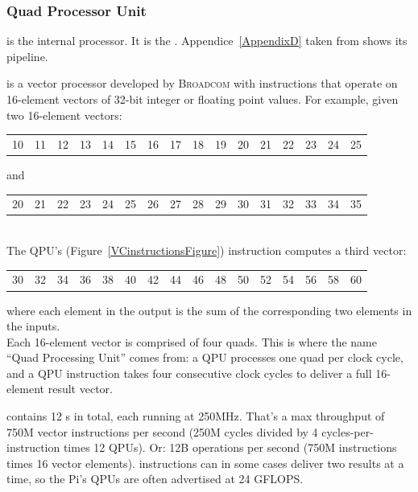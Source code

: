 \subsubsection{Quad Processor Unit}

\qpu{} is the \vc{} internal processor. It is the . Appendice~\ref{AppendixD} taken from \parencite{refVC} shows its pipeline.


\qpu{} is a  vector processor developed by \textsc{Broadcom} with instructions that operate on 16-element vectors of 32-bit integer or floating point values. For example, given two 16-element vectors:\\

\begin{tabular}{cccc|cccc|cccc|cccc}
	10&11&12&13&14&15&16&17&18&19&20&21&22&23&24&25
\end{tabular}

and

\begin{tabular}{cccc|cccc|cccc|cccc}
	20&21&22&23&24&25&26&27&28&29&30&31&32&33&34&35
\end{tabular}\\

The QPU's  (Figure~\ref{VCinstructionsFigure}) instruction computes a third vector:

\begin{tabular}{cccc|cccc|cccc|cccc}
	30&32&34&36&38&40&42&44&46&48&50&52&54&56&58&60
\end{tabular}

where each element in the output is the sum of the corresponding two elements in the inputs.\\

Each 16-element vector is comprised of four quads. This is where the name ``Quad Processing Unit'' comes from: a QPU processes one quad per clock cycle, and a QPU instruction takes four consecutive clock cycles to deliver a full 16-element result vector.

\rasp{} contains 12 \qpu{}s in total, each running at 250MHz. That's a max throughput of 750M vector instructions per second (250M cycles divided by 4 cycles-per-instruction times 12 QPUs). Or: 12B operations per second (750M instructions times 16 vector elements). \qpu{} instructions can in some cases deliver two results at a time, so the Pi's QPUs are often advertised at 24 GFLOPS.



